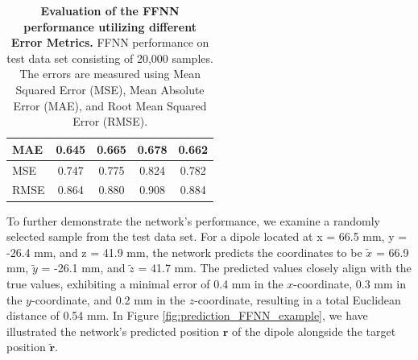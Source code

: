 \documentclass[a4paper, UKenglish, 11pt]{uiomaster}
\begin{document}
\begin{table}[!htb]
\begin{tabular}{l|cccc|}
\multicolumn{1}{|l|}{\cellcolor[HTML]{EFEFEF}MAE}  & \multicolumn{1}{c|}{0.645}                                                                                  & \multicolumn{1}{c|}{0.665}                                                                                   & \multicolumn{1}{c|}{0.678}                                                                                   & 0.662                                                                                                              \\ \hline
\multicolumn{1}{|l|}{\cellcolor[HTML]{EFEFEF}MSE}  & \multicolumn{1}{c|}{0.747}                                                                                  & \multicolumn{1}{c|}{0.775}                                                                                   & \multicolumn{1}{c|}{0.824}                                                                                   & 0.782                                                                                                              \\ \hline
\multicolumn{1}{|l|}{\cellcolor[HTML]{EFEFEF}RMSE} & \multicolumn{1}{c|}{0.864}                                                                                  & \multicolumn{1}{c|}{0.880}                                                                                   & \multicolumn{1}{c|}{0.908}                                                                                   & 0.884                                                                                                              \\ \hline
\end{tabular}
\caption{\textbf{Evaluation of the FFNN performance utilizing different Error Metrics.} \newline
FFNN performance on test data set consisting of 20,000 samples. The errors are measured using Mean Squared Error (MSE), Mean Absolute Error (MAE), and Root Mean Squared Error (RMSE).}
\label{table:error_simple_dipole}
\end{table}

To further demonstrate the network's performance, we examine a randomly selected sample from the test data set. For a dipole located at x = 66.5 mm, y = -26.4 mm, and z = 41.9 mm, the network predicts the coordinates to be $\tilde{x}$ = 66.9 mm, $\tilde{y}$ = -26.1 mm, and $\tilde{z}$ = 41.7 mm. The predicted values closely align with the true values, exhibiting a minimal error of 0.4 mm in the $x$-coordinate, 0.3 mm in the $y$-coordinate, and 0.2 mm in the $z$-coordinate, resulting in a total Euclidean distance of 0.54 mm. In Figure \ref{fig:prediction_FFNN_example}, we have illustrated the network's predicted position $\mathbf{r}$ of the dipole alongside the target position $\mathbf{\tilde{r}}$.
\end{document}
